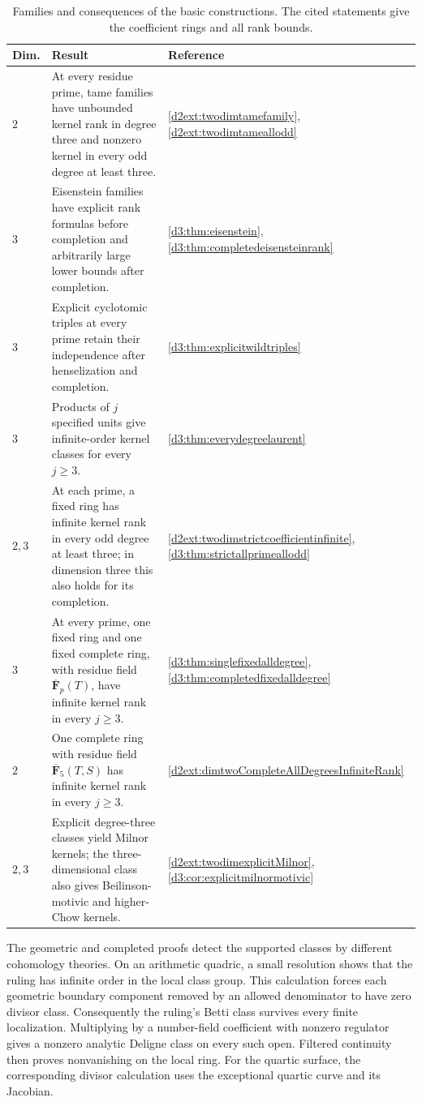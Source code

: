 \documentclass[11pt,a4paper]{amsart}
\numberwithin{equation}{section}
\theoremstyle{definition}
\theoremstyle{remark}
\newcommand{\F}{\mathbf F}
\begin{document}
\begin{table}[htbp]
\centering
\small
\renewcommand{\arraystretch}{1.18}
\begin{tabular}{@{}p{}p{}p{}@{}}
\hline
Dim. & Result & Reference\\
\hline
$2$ & At every residue prime, tame families have unbounded kernel rank
in degree three and nonzero kernel in every odd degree at least three.
& \ref{d2ext:twodimtamefamily}, \ref{d2ext:twodimtameallodd}\\
$3$ & Eisenstein families have explicit rank formulas before completion
and arbitrarily large lower bounds after completion.
& \ref{d3:thm:eisenstein}, \ref{d3:thm:completedeisensteinrank}\\
$3$ & Explicit cyclotomic triples at every prime retain their independence
after henselization and completion.
& \ref{d3:thm:explicitwildtriples}\\
$3$ & Products of $j$ specified units give infinite-order kernel classes
for every $j\geq3$.
& \ref{d3:thm:everydegreelaurent}\\
$2,3$ & At each prime, a fixed ring has infinite kernel rank in every odd
degree at least three; in dimension three this also holds for its completion.
& \ref{d2ext:twodimstrictcoefficientinfinite}, \ref{d3:thm:strictallprimeallodd}\\
$3$ & At every prime, one fixed ring and one fixed complete ring, with
residue field $\overline{\F}_p(T)$, have infinite kernel rank in every $j\geq3$.
& \ref{d3:thm:singlefixedalldegree}, \ref{d3:thm:completedfixedalldegree}\\
$2$ & One complete ring with residue field $\overline{\F}_5(T,S)$ has
infinite kernel rank in every $j\geq3$.
& \ref{d2ext:dimtwoCompleteAllDegreesInfiniteRank}\\
$2,3$ & Explicit degree-three classes yield Milnor kernels; the
three-dimensional class also gives Beilinson-motivic and higher-Chow kernels.
& \ref{d2ext:twodimexplicitMilnor}, \ref{d3:cor:explicitmilnormotivic}\\
\hline
\end{tabular}
\caption{Families and consequences of the basic constructions.
The cited statements give the coefficient rings and all rank bounds.}
\label{tab:intro-results}
\end{table}

The geometric and completed proofs detect the supported classes by
different cohomology theories. On an arithmetic quadric, a small
resolution shows that the ruling has infinite order in the local
class group. This calculation forces each geometric boundary component
removed by an allowed denominator to have zero divisor class.
Consequently the ruling's Betti class survives every finite
localization. Multiplying by a number-field coefficient with nonzero
regulator gives a nonzero analytic Deligne class on every such open.
Filtered continuity then proves nonvanishing on the local ring.
For the quartic surface, the corresponding divisor calculation uses
the exceptional quartic curve and its Jacobian.
\end{document}
